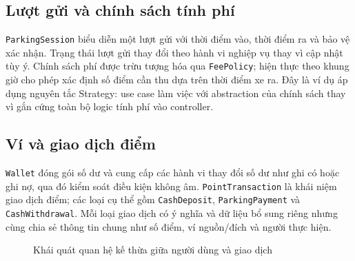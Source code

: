 \subsection{Lượt gửi và chính sách tính phí}
\texttt{ParkingSession} biểu diễn một lượt gửi với thời điểm vào, thời điểm ra và bảo vệ xác nhận. Trạng thái lượt gửi thay đổi theo hành vi nghiệp vụ thay vì cập nhật tùy ý. Chính sách phí được trừu tượng hóa qua \texttt{FeePolicy}; hiện thực theo khung giờ cho phép xác định số điểm cần thu dựa trên thời điểm xe ra. Đây là ví dụ áp dụng nguyên tắc Strategy: use case làm việc với abstraction của chính sách thay vì gắn cứng toàn bộ logic tính phí vào controller.

\subsection{Ví và giao dịch điểm}
\texttt{Wallet} đóng gói số dư và cung cấp các hành vi thay đổi số dư như ghi có hoặc ghi nợ, qua đó kiểm soát điều kiện không âm. \texttt{PointTransaction} là khái niệm giao dịch điểm; các loại cụ thể gồm \texttt{CashDeposit}, \texttt{ParkingPayment} và \texttt{CashWithdrawal}. Mỗi loại giao dịch có ý nghĩa và dữ liệu bổ sung riêng nhưng cùng chia sẻ thông tin chung như số điểm, ví nguồn/đích và người thực hiện.

\begin{figure}[htbp]
\centering
{}
\caption{Khái quát quan hệ kế thừa giữa người dùng và giao dịch}
\label{fig:domain-inheritance}
\end{figure}

